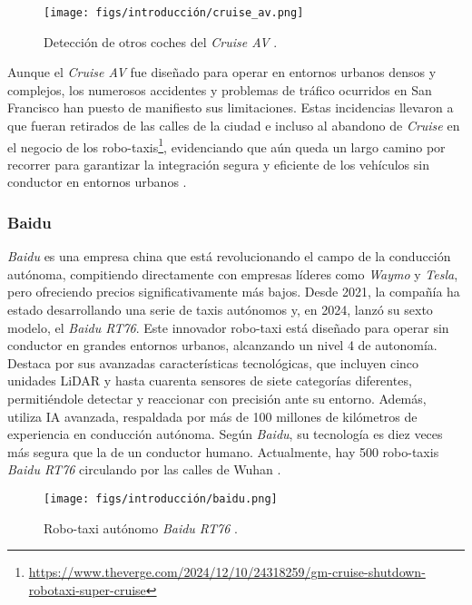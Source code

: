 \begin{figure}[ht]
\begin{center}
\texttt{[image: figs/introducción/cruise\_av.png]}
\end{center}
\caption{Detección de otros coches del \textit{Cruise AV} \cite{cruise-video}.}
\label{cruise}
\end{figure}

\newpage

Aunque el \textit{Cruise AV} fue diseñado para operar en entornos urbanos densos y complejos, los numerosos accidentes y problemas de tráfico ocurridos en San Francisco han puesto de manifiesto sus limitaciones. Estas incidencias llevaron a que fueran retirados de las calles de la ciudad e incluso al abandono de \textit{Cruise} en el negocio de los robo-taxis\footnote{\url{https://www.theverge.com/2024/12/10/24318259/gm-cruise-shutdown-robotaxi-super-cruise}}, evidenciando que aún queda un largo camino por recorrer para garantizar la integración segura y eficiente de los vehículos sin conductor en entornos urbanos \cite{robotaxis-cruise}.

\subsubsection{Baidu}

\textit{Baidu} es una empresa china que está revolucionando el campo de la conducción autónoma, compitiendo directamente con empresas líderes como \textit{Waymo} y \textit{Tesla}, pero ofreciendo precios significativamente más bajos. Desde 2021, la compañía ha estado desarrollando una serie de taxis autónomos y, en 2024, lanzó su sexto modelo, el \textit{Baidu RT76}. Este innovador robo-taxi está diseñado para operar sin conductor en grandes entornos urbanos, alcanzando un nivel 4 de autonomía. Destaca por sus avanzadas características tecnológicas, que incluyen cinco unidades \ac{LiDAR} y hasta cuarenta sensores de siete categorías diferentes, permitiéndole detectar y reaccionar con precisión ante su entorno. Además, utiliza \ac{IA} avanzada, respaldada por más de 100 millones de kilómetros de experiencia en conducción autónoma. Según \textit{Baidu}, su tecnología es diez veces más segura que la de un conductor humano. Actualmente, hay 500 robo-taxis \textit{Baidu RT76} circulando por las calles de Wuhan \cite{baidu}.

\begin{figure}[ht]
  \begin{center}
    \texttt{[image: figs/introducción/baidu.png]}
  \end{center}
  \caption{Robo-taxi autónomo \textit{Baidu RT76} \cite{foto-baidu}.}
  \label{baidu}
\end{figure}

